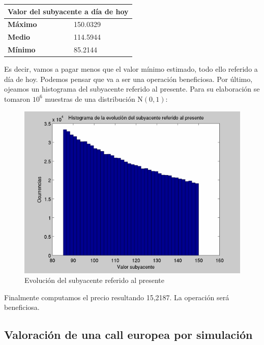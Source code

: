 \documentclass[a4paper,11pt]{article}
\begin{document}
\begin{center}
\begin{tabular}{|p{2.5cm}|p{3.5cm}|}
\hline
\multicolumn{2}{|c|}{\textbf{Valor del subyacente a d\'ia de hoy}}\\
\hline
\hline
\textbf{M\'aximo} & 150.0329\\
\hline
\textbf{Medio}    & 114.5944\\
\hline
\textbf{M\'inimo} & 85.2144\\
\hline
\end{tabular}
\end{center}

Es decir, vamos a pagar menos que el valor m\'inimo estimado, todo ello referido
a d\'ia de hoy. Podemos pensar que va a ser una operaci\'on
beneficiosa. Por \'ultimo, ojeamos un histograma del subyacente referido al presente. Para su
elaboraci\'on se tomaron $10^6$ muestras de una distribuci\'on $\mathrm{N}(0,1)$:

\begin{figure}[htb]
   \begin{center}
      \includegraphics[scale=0.5,
      keepaspectratio]{./figures/histCallEUquad.png}
   \end{center}
   \caption{Evoluci\'on del subyacente referido al presente}
\end{figure}

Finalmente computamos el precio resultando 15,2187. La operaci\'on ser\'a
beneficiosa.

\subsection{Valoraci\'on de una call europea por simulaci\'on}
\end{document}
